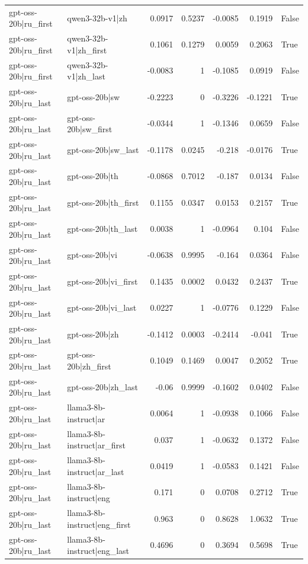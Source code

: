 \begin{table}
\begin{tabular}{l l r r r r l}
gpt-oss-20b|ru_first & qwen3-32b-v1|zh & 0.0917 & 0.5237 & -0.0085 & 0.1919 & False \\
gpt-oss-20b|ru_first & qwen3-32b-v1|zh_first & 0.1061 & 0.1279 & 0.0059 & 0.2063 & True \\
gpt-oss-20b|ru_first & qwen3-32b-v1|zh_last & -0.0083 & 1 & -0.1085 & 0.0919 & False \\
gpt-oss-20b|ru_last & gpt-oss-20b|sw & -0.2223 & 0 & -0.3226 & -0.1221 & True \\
gpt-oss-20b|ru_last & gpt-oss-20b|sw_first & -0.0344 & 1 & -0.1346 & 0.0659 & False \\
gpt-oss-20b|ru_last & gpt-oss-20b|sw_last & -0.1178 & 0.0245 & -0.218 & -0.0176 & True \\
gpt-oss-20b|ru_last & gpt-oss-20b|th & -0.0868 & 0.7012 & -0.187 & 0.0134 & False \\
gpt-oss-20b|ru_last & gpt-oss-20b|th_first & 0.1155 & 0.0347 & 0.0153 & 0.2157 & True \\
gpt-oss-20b|ru_last & gpt-oss-20b|th_last & 0.0038 & 1 & -0.0964 & 0.104 & False \\
gpt-oss-20b|ru_last & gpt-oss-20b|vi & -0.0638 & 0.9995 & -0.164 & 0.0364 & False \\
gpt-oss-20b|ru_last & gpt-oss-20b|vi_first & 0.1435 & 0.0002 & 0.0432 & 0.2437 & True \\
gpt-oss-20b|ru_last & gpt-oss-20b|vi_last & 0.0227 & 1 & -0.0776 & 0.1229 & False \\
gpt-oss-20b|ru_last & gpt-oss-20b|zh & -0.1412 & 0.0003 & -0.2414 & -0.041 & True \\
gpt-oss-20b|ru_last & gpt-oss-20b|zh_first & 0.1049 & 0.1469 & 0.0047 & 0.2052 & True \\
gpt-oss-20b|ru_last & gpt-oss-20b|zh_last & -0.06 & 0.9999 & -0.1602 & 0.0402 & False \\
gpt-oss-20b|ru_last & llama3-8b-instruct|ar & 0.0064 & 1 & -0.0938 & 0.1066 & False \\
gpt-oss-20b|ru_last & llama3-8b-instruct|ar_first & 0.037 & 1 & -0.0632 & 0.1372 & False \\
gpt-oss-20b|ru_last & llama3-8b-instruct|ar_last & 0.0419 & 1 & -0.0583 & 0.1421 & False \\
gpt-oss-20b|ru_last & llama3-8b-instruct|eng & 0.171 & 0 & 0.0708 & 0.2712 & True \\
gpt-oss-20b|ru_last & llama3-8b-instruct|eng_first & 0.963 & 0 & 0.8628 & 1.0632 & True \\
gpt-oss-20b|ru_last & llama3-8b-instruct|eng_last & 0.4696 & 0 & 0.3694 & 0.5698 & True \\

\end{tabular}
\end{table}
